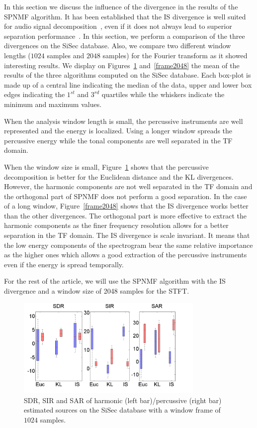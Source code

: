 In this section we discuss the influence of the divergence in the results of the SPNMF algorithm. It has been established that the IS divergence is well suited for audio signal decomposition~\cite{gray1980distortion}, even if it does not always lead to superior separation performance~\cite{canadas2014percussive}. In this section, we perform a comparison of the three divergences on the SiSec database. Also, we compare two different window lengths ($1024$ samples and $2048$ samples) for the Fourier transform as it showed interesting results. We display on Figures~\ref{frame1024} and~\ref{frame2048} the mean of the results of the three algorithms computed on the SiSec database. Each box-plot is made up of a central line indicating the median of the data, upper and lower box edges indicating the $1^{st}$ and $3^{rd}$ quartiles while the whiskers indicate the minimum and maximum values. 

When the analysis window length is small, the percussive instruments are well represented and the energy is localized. Using a longer window spreads the percussive energy while the tonal components are well separated in the TF domain.

When the window size is small, Figure~\ref{frame1024} shows that the percussive decomposition is better for the Euclidean distance and the KL divergences. However, the harmonic components are not well separated in the TF domain and the orthogonal part of SPNMF does not perform a good separation.  
In the case of a long window, Figure~\ref{frame2048} shows that the IS divergence works better than the other divergences. The orthogonal part is more effective to extract the harmonic components as the finer frequency resolution allows for a better separation in the TF domain. The IS divergence is scale invariant. It means that the low energy components of the spectrogram bear the same relative importance as the higher ones which allows a good extraction of the percussive instruments even if the energy is spread temporally.


For the rest of the article, we will use the SPNMF algorithm with the IS divergence and a window size of 2048 samples for the STFT.


\begin{figure}[t]

  \centering 
  \includegraphics[width=9cm]{fig/DivergenceFrame1024}
  \caption{\label{frame1024} SDR, SIR and SAR of harmonic (left bar)/percussive (right bar) estimated sources on the SiSec database with a window frame of $1024$ samples.}
  
\end{figure}


